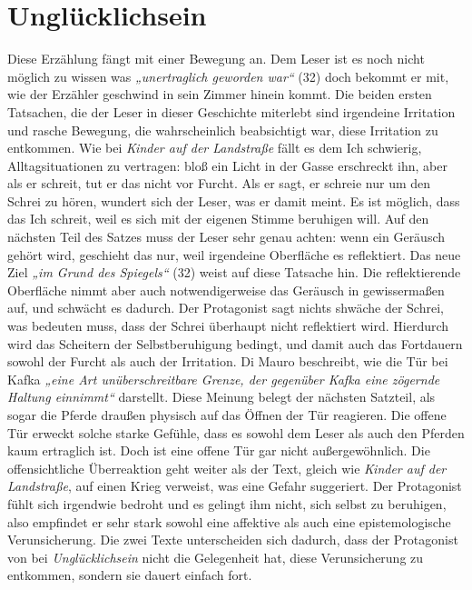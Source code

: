 \documentclass[12pt,a4paper]{article}
\begin{document}
\section{Unglücklichsein}
%
Diese Erzählung fängt mit einer Bewegung an. Dem Leser ist es noch nicht möglich zu wissen was \textit{„unertraglich geworden war“} (32) doch bekommt er mit, wie der Erzähler geschwind in sein Zimmer hinein kommt. Die beiden ersten Tatsachen, die der Leser in dieser Geschichte miterlebt sind irgendeine Irritation und rasche Bewegung, die wahrscheinlich beabsichtigt war, diese Irritation zu entkommen. Wie bei \textit{Kinder auf der Landstraße} fällt es dem Ich schwierig, Alltagsituationen zu vertragen: bloß ein Licht in der Gasse erschreckt ihn, aber als er schreit, tut er das nicht vor Furcht. Als er sagt, er schreie nur um den Schrei zu hören, wundert sich der Leser, was er damit meint. Es ist möglich, dass das Ich schreit, weil es sich mit der eigenen Stimme beruhigen will. Auf den nächsten Teil des Satzes muss der Leser sehr genau achten: wenn ein Geräusch gehört wird, geschieht das nur, weil irgendeine Oberfläche es reflektiert. Das neue Ziel \textit{„im Grund des Spiegels“} (32) weist auf diese Tatsache hin. Die reflektierende Oberfläche nimmt aber auch notwendigerweise das Geräusch in gewissermaßen auf, und schwächt es dadurch. Der Protagonist sagt nichts shwäche der Schrei, was bedeuten muss, dass der Schrei überhaupt nicht reflektiert wird. Hierdurch wird das Scheitern der Selbstberuhigung bedingt, und damit auch das Fortdauern sowohl der Furcht als auch der Irritation. Di Mauro beschreibt, wie die Tür bei Kafka \textit{„eine Art unüberschreitbare Grenze, der gegenüber Kafka eine zögernde Haltung einnimmt“}\autocite[68]{mauro} darstellt. Diese Meinung belegt der nächsten Satzteil, als sogar die Pferde draußen physisch auf das Öffnen der Tür reagieren. Die offene Tür erweckt solche starke Gefühle, dass es sowohl dem Leser als auch den Pferden kaum ertraglich ist. Doch ist eine offene Tür gar nicht außergewöhnlich. Die offensichtliche Überreaktion geht weiter als der Text, gleich wie \textit{Kinder auf der Landstraße}, auf einen Krieg verweist, was eine Gefahr suggeriert. Der Protagonist fühlt sich irgendwie bedroht und es gelingt ihm nicht, sich selbst zu beruhigen, also empfindet er sehr stark sowohl eine affektive als auch eine epistemologische Verunsicherung. Die zwei Texte unterscheiden sich dadurch, dass der Protagonist von bei \textit{Unglücklichsein} nicht die Gelegenheit hat, diese Verunsicherung zu entkommen, sondern sie dauert einfach fort.\par
\end{document}
